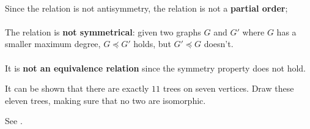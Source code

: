 \documentclass{article}
\begin{document}
\begin{exercise}
\begin{answer}
\paragraph{}Since the relation is not antisymmetry, the relation is not a \textbf{partial order};
\paragraph{}The relation is \textbf{not symmetrical}: given two graphs $G$  and $G'$ where $G$ has a smaller maximum degree, $G\preceq G'$ holds, but $G'\preceq G$ doesn't.
\paragraph{}It is \textbf{not an equivalence relation} since the symmetry property does not hold.
\end{answer}
\end{exercise}

\begin{exercise}
It can be shown that there are exactly $11$ trees on seven vertices. Draw these eleven trees, making sure that no two are isomorphic.
\begin{answer}
See .
\end{answer}
\end{exercise}
\end{document}
